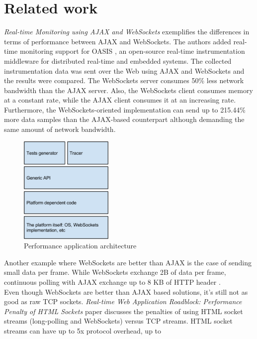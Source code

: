 \documentclass[conference]{IEEEtran}
\begin{document}
\section{Related work}
\textit{Real-time Monitoring using AJAX and WebSockets} \cite{RT-Monitoring}
exemplifies the differences in terms of performance between AJAX and WebSockets.
The authors added real-time monitoring support for OASIS \cite{OASIS},
an open-source real-time instrumentation middleware for distributed real-time
and embedded systems. The collected instrumentation data was sent over the Web
using AJAX and WebSockets and the results were compared. The WebSockets server
consumes 50\% less network bandwidth than the AJAX server. Also, the WebSockets
client consumes memory at a constant rate, while the AJAX client consumes it
at an increasing rate. Furthermore, the WebSockets-oriented implementation can
send up to 215.44\% more data samples than the AJAX-based counterpart although
demanding the same amount of network bandwidth.
\\
\begin{frame}{}
  \begin{figure}
    \centering
    \includegraphics[width=0.4\textwidth]{Architecture.png}
    \caption{Performance application architecture}
  \end{figure}
\end{frame}
\indent
Another example where WebSockets are better than AJAX is the case of sending
small data per frame. While WebSockets exchange 2B of data per frame, continuous
polling with AJAX exchange up to 8 KB of HTTP header \cite{2009:Misc}.
\\
\indent
Even though WebSockets are better than AJAX based solutions, it's still not as
good as raw TCP sockets. \textit{Real-time Web Application Roadblock:
Performance Penalty of HTML Sockets} paper \cite{Performance-Penalty} discusses
the penalties of using HTML socket streams (long-polling and WebSockets)
versus TCP streams. HTML socket streams can have up to 5x protocol overhead, up to
\end{document}
